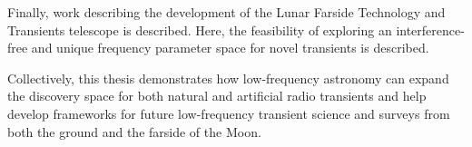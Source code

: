 Finally, work describing the development of the Lunar Farside Technology and Transients telescope is described. Here, the feasibility of exploring an interference-free and unique frequency parameter space for novel transients is described. 

Collectively, this thesis demonstrates how low-frequency astronomy can expand the discovery space for both natural and artificial radio transients and help develop frameworks for future low-frequency transient science and surveys from both the ground and the farside of the Moon.  